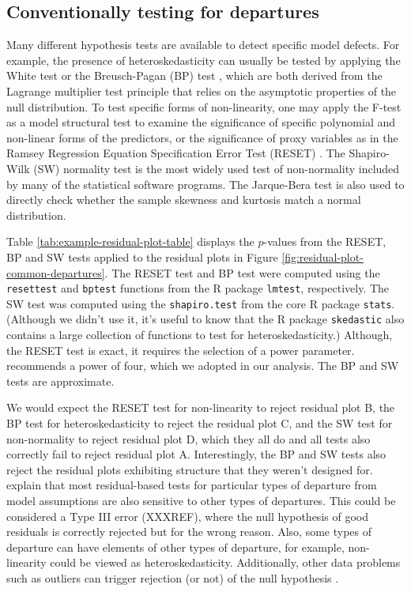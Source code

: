 \documentclass[]{interact}
\theoremstyle{plain}%
\theoremstyle{definition}
\theoremstyle{remark}
\begin{document}
\hypertarget{conventionally-testing-for-departures}{%
\subsection{Conventionally testing for
departures}\label{conventionally-testing-for-departures}}

Many different hypothesis tests are available to detect specific model
defects. For example, the presence of heteroskedasticity can usually be
tested by applying the White test
\citep{white_heteroskedasticity-consistent_1980} or the Breusch-Pagan
(BP) test \citep{breusch_simple_1979}, which are both derived from the
Lagrange multiplier test \citep{silvey1959lagrangian} principle that
relies on the asymptotic properties of the null distribution. To test
specific forms of non-linearity, one may apply the F-test as a model
structural test to examine the significance of specific polynomial and
non-linear forms of the predictors, or the significance of proxy
variables as in the Ramsey Regression Equation Specification Error Test
(RESET) \citep{ramsey_tests_1969}. The Shapiro-Wilk (SW) normality test
\citep{shapiro1965analysis} is the most widely used test of
non-normality included by many of the statistical software programs. The
Jarque-Bera test \citep{jarque1980efficient} is also used to directly
check whether the sample skewness and kurtosis match a normal
distribution.

Table \ref{tab:example-residual-plot-table} displays the \(p\)-values
from the RESET, BP and SW tests applied to the residual plots in Figure
\ref{fig:residual-plot-common-departures}. The RESET test and BP test
were computed using the \texttt{resettest} and \texttt{bptest} functions
from the R package \texttt{lmtest}, respectively. The SW test was
computed using the \texttt{shapiro.test} from the core R package
\texttt{stats}. (Although we didn't use it, it's useful to know that the
R package \texttt{skedastic} \citep{skedastic} also contains a large
collection of functions to test for heteroskedasticity.) Although, the
RESET test is exact, it requires the selection of a power parameter.
\citet{ramsey_tests_1969} recommends a power of four, which we adopted
in our analysis. The BP and SW tests are approximate.

We would expect the RESET test for non-linearity to reject residual plot
B, the BP test for heteroskedasticity to reject the residual plot C, and
the SW test for non-normality to reject residual plot D, which they all
do and all tests also correctly fail to reject residual plot A.
Interestingly, the BP and SW tests also reject the residual plots
exhibiting structure that they weren't designed for.
\citet{cook1982residuals} explain that most residual-based tests for
particular types of departure from model assumptions are also sensitive
to other types of departures. This could be considered a Type III error
(XXXREF), where the null hypothesis of good residuals is correctly
rejected but for the wrong reason. Also, some types of departure can
have elements of other types of departure, for example, non-linearity
could be viewed as heteroskedasticity. Additionally, other data problems
such as outliers can trigger rejection (or not) of the null hypothesis
\citep{cook_applied_1999}.
\end{document}
